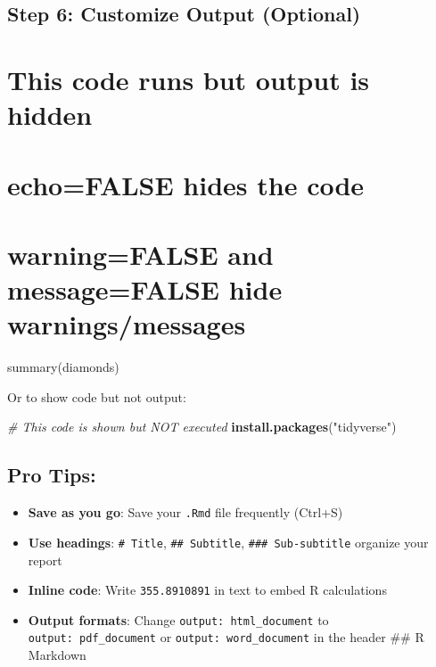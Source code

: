 \documentclass[
]{article}
\newenvironment{Shaded}{\begin{snugshade}}{\end{snugshade}}
\newcommand{\CommentTok}[1]{\textcolor[rgb]{0.56,0.35,0.01}{\textit{#1}}}
\newcommand{\FunctionTok}[1]{\textcolor[rgb]{0.13,0.29,0.53}{\textbf{#1}}}
\newcommand{\NormalTok}[1]{#1}
\newcommand{\StringTok}[1]{\textcolor[rgb]{0.31,0.60,0.02}{#1}}
\providecommand{\tightlist}{%
  \setlength{\itemsep}{0pt}\setlength{\parskip}{0pt}}
\begin{document}
\subsection{Step 6: Customize Output
(Optional)}\label{step-6-customize-output-optional}

\section{This code runs but output is
hidden}\label{this-code-runs-but-output-is-hidden}

\section{echo=FALSE hides the code}\label{echofalse-hides-the-code}

\section{warning=FALSE and message=FALSE hide
warnings/messages}\label{warningfalse-and-messagefalse-hide-warningsmessages}

summary(diamonds)

Or to show code but not output:

\begin{Shaded}
\begin{Highlighting}[]
\CommentTok{\# This code is shown but NOT executed}
\FunctionTok{install.packages}\NormalTok{(}\StringTok{"tidyverse"}\NormalTok{)}
\end{Highlighting}
\end{Shaded}

\subsection{Pro Tips:}\label{pro-tips}

\begin{itemize}
\tightlist
\item
  \textbf{Save as you go}: Save your \texttt{.Rmd} file frequently
  (Ctrl+S)
\item
  \textbf{Use headings}: \texttt{\#\ Title}, \texttt{\#\#\ Subtitle},
  \texttt{\#\#\#\ Sub-subtitle} organize your report
\item
  \textbf{Inline code}: Write \texttt{355.8910891} in text to embed R
  calculations
\item
  \textbf{Output formats}: Change \texttt{output:\ html\_document} to
  \texttt{output:\ pdf\_document} or \texttt{output:\ word\_document} in
  the header \#\# R Markdown
\end{itemize}
\end{document}

